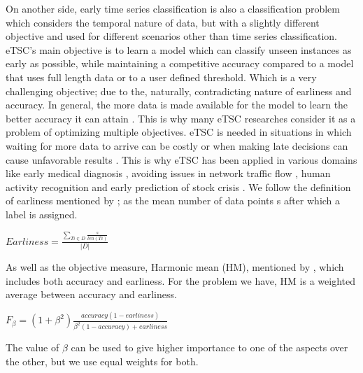 On another side, early time series classification is also a classification problem which considers the temporal nature of data,
but with a slightly different objective and used for different scenarios other than time series classification.\newline
eTSC's main objective is to learn a model which can classify unseen instances as early as possible,
while maintaining a competitive accuracy compared to a model that uses full length data or to a user defined threshold\cite{xing2009early}.
Which is a very challenging objective; due to the, naturally, contradicting nature of earliness and accuracy.
In general, the more data is made available for the model to learn the better accuracy it can attain \cite{mori2019early,tavenard2016cost,xing2012early,mori2017reliable}.
This is why many eTSC researches consider it as a problem of optimizing multiple objectives.\newline
eTSC is needed in situations in which waiting for more data to arrive can be costly or
when making late decisions can cause unfavorable results \cite{mori2017early,parrish2013classifying,lin2015reliable}.
This is why eTSC has been applied in various domains like early medical diagnosis \cite{griffin2001toward,ghalwash2012early},
avoiding issues in network traffic flow \cite{bernaille2006traffic}, human activity recognition \cite{yazdanbakhsh2019multivariate,gupta2020fault}
and early prediction of stock crisis \cite{ghalwash2014utilizing}.\newline
We follow the definition of earliness mentioned by \cite{schafer2020teaser}; as the mean number of data points s after which a label is assigned.
\begin{definition}
    $Earliness = \frac{\sum_{T{i}\in D} \frac{s}{len(T{i})} }{|D|}$
\end{definition}
As well as the objective measure, Harmonic mean (HM), mentioned by \cite{ghalwash2012early,schafer2020teaser}, which includes both accuracy and earliness.
For the problem we have, HM is a weighted average between accuracy and earliness.
\begin{definition}
    $F_{\beta} = (1 + \beta^2)\frac{accuracy(1-earliness)}{\beta^2(1-accuracy)+earliness}$
\end{definition}
The value of $\beta$ can be used to give higher importance to one of the aspects over the other, but we use equal weights for both.